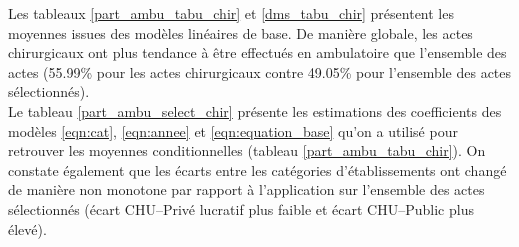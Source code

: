 Les tableaux \ref{part_ambu_tabu_chir} et \ref{dms_tabu_chir} présentent les moyennes issues des modèles linéaires de base. De manière globale, les actes chirurgicaux ont plus tendance à être effectués en ambulatoire que l'ensemble des actes (55.99\% pour les actes chirurgicaux contre 49.05\% pour l'ensemble des actes sélectionnés).\\

Le tableau \ref{part_ambu_select_chir} présente les estimations des coefficients des modèles \ref{eqn:cat}, \ref{eqn:annee} et \ref{eqn:equation_base} qu'on a utilisé pour retrouver les moyennes conditionnelles (tableau \ref{part_ambu_tabu_chir}). On constate également que les écarts entre les catégories d'établissements ont changé de manière non monotone par rapport à l'application sur l'ensemble des actes sélectionnés (écart CHU--Privé lucratif plus faible et écart CHU--Public plus élevé).


